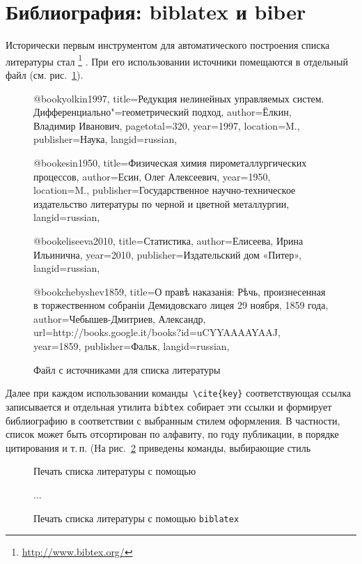 \documentclass[a4paper,12pt]{article}
\newcommand\foothref[2]{%
  \href{#1}{#2}\footnote{\url{#1}}%
}
\newcommand\package[1]{\texttt{#1}}
\begin{document}
\section{Библиография: biblatex и biber}
Исторически первым инструментом для автоматического построения
списка литературы стал \foothref{http://www.bibtex.org/}{\BibTeX}. При его
использовании источники
помещаются в отдельный файл (см. рис.~\ref{bibfile}).
\begin{figure}[tp]
\begin{bibtexcode}
@book{yolkin1997,
  title={Редукция нелинейных управляемых систем.
         Дифференциально"=геометрический подход},
  author={Ёлкин, Владимир Иванович},
  pagetotal={320},
  year={1997},
  location={M.},
  publisher={Наука},
  langid={russian},
}

@book{esin1950,
  title={Физическая химия пирометаллургических процессов},
  author={Есин, Олег Алексеевич},
  year={1950},
  location={M.},
  publisher={Государственное научно-техническое издательство
             литературы по черной и цветной металлургии},
  langid={russian},
}

@book{eliseeva2010,
  title={Статистика},
  author={Елисеева, Ирина Ильинична},
  year={2010},
  publisher={Издательский дом «Питер»},
  langid={russian},
}

@book{chebyshev1859,
  title={О правѣ наказанія: Рѣчь, произнесенная в торжественном
         собраніи Демидовскаго лицея 29 ноября, 1859 года},
  author={Чебышев-Дмитриев, Александр},
  url={http://books.google.it/books?id=uCYYAAAAYAAJ},
  year={1859},
  publisher={Фальк},
  langid={russian},
}
\end{bibtexcode}
\caption{Файл с источниками для списка литературы}\label{bibfile}
\end{figure}
Далее при каждом использовании команды~\verb|\cite{key}| соответствующая
ссылка записывается и отдельная утилита \package{bibtex} собирает эти
ссылки и формирует библиографию в соответствии с выбранным стилем оформления.
В частности, список может быть отсортирован по алфавиту, по году
публикации, в порядке цитирования и т.\,п.
(На рис.~\ref{bibliography} приведены команды, выбирающие стиль
\begin{figure}[tp]
\begin{latexcode}


\end{latexcode}
\caption{Печать списка литературы с помощью \BibTeX}\label{bibliography}
\end{figure}
\begin{figure}[tp]
\begin{latexcode}
\usepackage[style=gost-authoryear]{biblatex}


...

\printbibliography
\end{latexcode}
\caption{Печать списка литературы с помощью \package{biblatex}}\label{biblatex1}
\end{figure}
\end{document}
